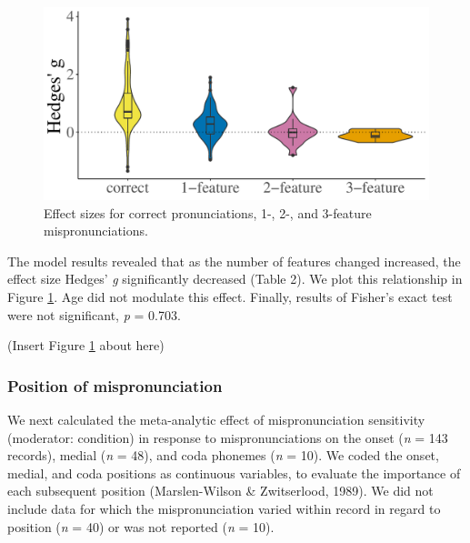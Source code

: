 \documentclass[
  english,
  man, noextraspace]{apa6}
\begin{document}
\begin{figure}
\centering
\includegraphics{VonHolzenBergmann_MPMetaAnalysis_files/figure-latex/PlotFeatEffect-1.pdf}
\caption{\label{fig:PlotFeatEffect}Effect sizes for correct pronunciations, 1-, 2-, and 3-feature mispronunciations.}
\end{figure}

The model results revealed that as the number of features changed increased, the effect size Hedges' \emph{g} significantly decreased (Table 2). We plot this relationship in Figure \ref{fig:PlotFeatEffect}. Age did not modulate this effect. Finally, results of Fisher's exact test were not significant, \emph{p} = 0.703.

(Insert Figure \ref{fig:PlotFeatEffect} about here)

\hypertarget{position-of-mispronunciation}{%
\subsubsection{Position of mispronunciation}\label{position-of-mispronunciation}}

We next calculated the meta-analytic effect of mispronunciation sensitivity (moderator: condition) in response to mispronunciations on the onset (\emph{n} = 143 records), medial (\emph{n} = 48), and coda phonemes (\emph{n} = 10). We coded the onset, medial, and coda positions as continuous variables, to evaluate the importance of each subsequent position (Marslen-Wilson \& Zwitserlood, 1989). We did not include data for which the mispronunciation varied within record in regard to position (\emph{n} = 40) or was not reported (\emph{n} = 10).
\end{document}
